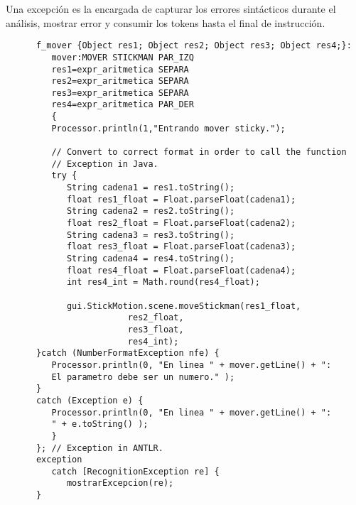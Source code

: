    Una excepción es la encargada de capturar los errores sintácticos durante el análisis, mostrar error y consumir los tokens hasta el
   final de instrucción.
   \begin{lstlisting}
      f_mover {Object res1; Object res2; Object res3; Object res4;}: 
         mover:MOVER STICKMAN PAR_IZQ
         res1=expr_aritmetica SEPARA
         res2=expr_aritmetica SEPARA
         res3=expr_aritmetica SEPARA
         res4=expr_aritmetica PAR_DER 
         {
         Processor.println(1,"Entrando mover sticky.");
      
         // Convert to correct format in order to call the function
         // Exception in Java.
         try {
            String cadena1 = res1.toString(); 
            float res1_float = Float.parseFloat(cadena1);
            String cadena2 = res2.toString(); 
            float res2_float = Float.parseFloat(cadena2);
            String cadena3 = res3.toString(); 
            float res3_float = Float.parseFloat(cadena3);
            String cadena4 = res4.toString(); 
            float res4_float = Float.parseFloat(cadena4);
            int res4_int = Math.round(res4_float);
      
            gui.StickMotion.scene.moveStickman(res1_float, 
                        res2_float, 
                        res3_float, 
                        res4_int);
      }catch (NumberFormatException nfe) {
         Processor.println(0, "En linea " + mover.getLine() + ": 
         El parametro debe ser un numero." );
      } 
      catch (Exception e) {
         Processor.println(0, "En linea " + mover.getLine() + ": 
         " + e.toString() );
         }
      }; // Exception in ANTLR.
      exception
         catch [RecognitionException re] {
            mostrarExcepcion(re);
      }
   \end{lstlisting}

